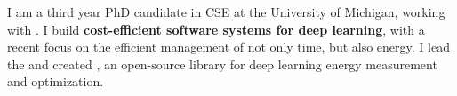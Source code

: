 

\begin{cvparagraph}

I am a third year PhD candidate in CSE at the University of Michigan, working with \href{https://mosharaf.com}{}.
I build \textbf{cost-efficient software systems for deep learning}, with a recent focus on the efficient management of not only time, but also energy.
I lead the \href{https://ml.energy}{} and created \href{https://ml.energy/zeus}{}, an open-source library for deep learning energy measurement and optimization.
\end{cvparagraph}
